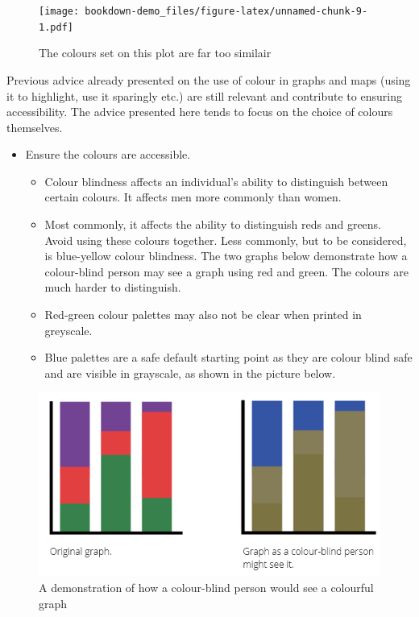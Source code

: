 \documentclass[
]{book}
\begin{document}
\begin{figure}
\centering
\texttt{[image: bookdown-demo\_files/figure-latex/unnamed-chunk-9-1.pdf]}
\caption{\label{fig:unnamed-chunk-9}The colours set on this plot are far too similair}
\end{figure}

Previous advice already presented on the use of colour in graphs and maps (using it to highlight, use it sparingly etc.) are still relevant and contribute to ensuring accessibility. The advice presented here tends to focus on the choice of colours themselves.

\begin{itemize}
\item
  Ensure the colours are accessible.

  \begin{itemize}
  \item
    Colour blindness affects an individual's ability to distinguish between certain colours. It affects men more commonly than women.
  \item
    Most commonly, it affects the ability to distinguish reds and greens. Avoid using these colours together. Less commonly, but to be considered, is blue-yellow colour blindness. The two graphs below demonstrate how a colour-blind person may see a graph using red and green. The colours are much harder to distinguish.
  \item
    Red-green colour palettes may also not be clear when printed in greyscale.
  \item
    Blue palettes are a safe default starting point as they are colour blind safe and are visible in grayscale, as shown in the picture below.
  \end{itemize}
\end{itemize}

\begin{figure}
\includegraphics[width=1\linewidth]{img/colour_blind_graphs} \caption{A demonstration of how a colour-blind person would see a colourful graph}\label{fig:unnamed-chunk-10}
\end{figure}
\end{document}
